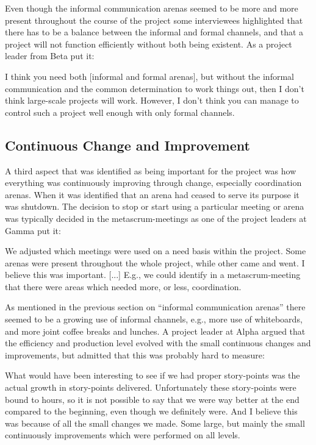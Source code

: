Even though the informal communication arenas seemed to be more and more present throughout the course of the project some interviewees highlighted that there has to be a balance between the informal and formal channels, and that a project will not function efficiently without both being existent. As a project leader from Beta put it:

\begin{fancyquotes}
I think you need both [informal and formal arenas], but without the informal communication and the common determination to work things out, then I don't think large-scale projects will work. However, I don't think you can manage to control such a project well enough with only formal channels.
\end{fancyquotes}

\subsection{Continuous Change and Improvement}

A third aspect that was identified as being important for the project was how everything was continuously improving through change, especially coordination arenas. When it was identified that an arena had ceased to serve its purpose it was shutdown. The decision to stop or start using a particular meeting or arena was typically decided in the metascrum-meetings as one of the project leaders at Gamma put it:

\begin{fancyquotes}
We adjusted which meetings were used on a need basis within the project. Some arenas were present throughout the whole project, while other came and went. I believe this was important. [...] E.g., we could identify in a metascrum-meeting that there were areas which needed more, or less, coordination.
\end{fancyquotes}

As mentioned in the previous section on ``informal communication arenas'' there seemed to be a growing use of informal channels, e.g., more use of whiteboards, and more joint coffee breaks and lunches. A project leader at Alpha argued that the efficiency and production level evolved with the small continuous changes and improvements, but admitted that this was probably hard to measure:

\begin{fancyquotes}
What would have been interesting to see if we had proper story-points was the actual growth in story-points delivered. Unfortunately these story-points were bound to hours, so it is not possible to say that we were way better at the end compared to the beginning, even though we definitely were. And I believe this was because of all the small changes we made. Some large, but mainly the small continuously improvements which were performed on all levels.
\end{fancyquotes}

